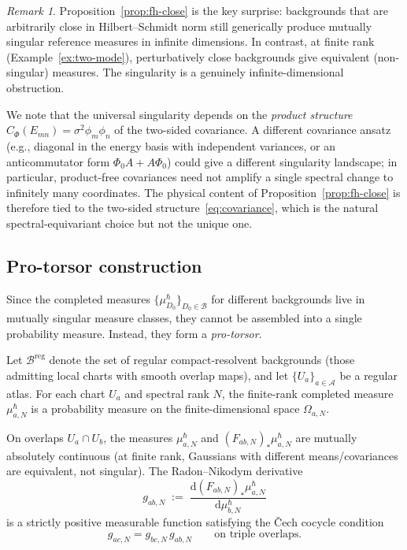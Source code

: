 \documentclass[12pt,a4paper]{article}
\theoremstyle{plain}
\theoremstyle{definition}
\theoremstyle{remark}
\newtheorem{remark}[theorem]{Remark}
\newcommand{\dd}{\mathrm{d}}
\begin{document}
\begin{remark}
Proposition~\ref{prop:fh-close} is the key surprise: backgrounds
that are arbitrarily close in Hilbert--Schmidt norm still generically
produce mutually singular reference measures in infinite dimensions.  In contrast, at
finite rank (Example~\ref{ex:two-mode}), perturbatively close
backgrounds give equivalent (non-singular) measures.  The singularity
is a genuinely infinite-dimensional obstruction.

We note that the universal singularity depends on the
\emph{product structure} $C_\Phi(E_{mn}) = \sigma^2\phi_m\phi_n$
of the two-sided covariance.  A different covariance ansatz (e.g.,
diagonal in the energy basis with independent variances, or an
anticommutator form $\Phi_0 A + A\Phi_0$) could give a different
singularity landscape; in particular, product-free covariances need
not amplify a single spectral change to infinitely many coordinates.
The physical content of Proposition~\ref{prop:fh-close} is therefore
tied to the two-sided structure~\eqref{eq:covariance}, which is the
natural spectral-equivariant choice but not the unique one.
\end{remark}

\subsection{Pro-torsor construction}

Since the completed measures
$\{\mu_{D_0}^\hbar\}_{D_0 \in \mathcal{B}}$ for different
backgrounds live in mutually singular measure classes, they cannot be
assembled into a single probability measure.  Instead, they form a
\emph{pro-torsor}.

Let $\mathcal{B}^{\mathrm{reg}}$ denote the set of regular
compact-resolvent backgrounds (those admitting local charts with
smooth overlap maps), and let $\{U_a\}_{a \in \mathcal{A}}$ be a
regular atlas.  For each chart $U_a$ and spectral rank $N$, the
finite-rank completed measure $\mu_{a,N}^\hbar$ is a probability
measure on the finite-dimensional space $\Omega_{a,N}$.

On overlaps $U_a \cap U_b$, the measures $\mu_{a,N}^\hbar$ and
$(F_{ab,N})_*\mu_{a,N}^\hbar$ are mutually absolutely continuous (at
finite rank, Gaussians with different means/covariances are
equivalent, not singular).  The Radon--Nikodym derivative
\begin{equation}
  g_{ab,N} \;:=\; \frac{\dd(F_{ab,N})_*\mu_{a,N}^\hbar}
    {\dd\mu_{b,N}^\hbar}
\end{equation}
is a strictly positive measurable function satisfying the \v{C}ech
cocycle condition
\begin{equation}\label{eq:cocycle}
  g_{ac,N} = g_{bc,N}\,g_{ab,N}
  \qquad\text{on triple overlaps}.
\end{equation}
\end{document}
